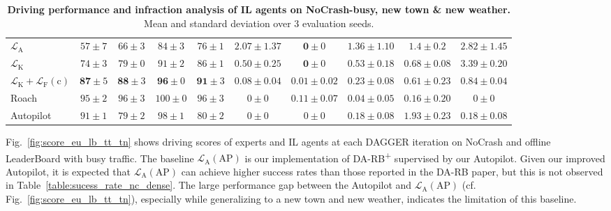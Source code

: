 \begin{table}
\begin{tabular}{lccccccccc}
		$\mathcal{L}_\text{A}$
		& $57\pm7$ & $66\pm3$ & $84\pm3$ & $76\pm1$ 
		& $2.07\pm1.37$ & $\mathbf{0}\pm0$ & $1.36\pm1.10$ & $1.4\pm0.2$ & $2.82\pm1.45$ \\
		$\mathcal{L}_\text{K}$
		& $74\pm3$ & $79\pm0$ & $91\pm2$ & $86\pm1$ 
		& $0.50\pm0.25$ & $\mathbf{0}\pm0$ & $0.53\pm0.18$ & $0.68\pm0.08$ & $3.39\pm0.20$ \\
		$\mathcal{L}_\text{K}+\mathcal{L}_\text{F}(\text{c})$
		& $\mathbf{87} \pm 5$ & $\mathbf{88} \pm 3$ & $\mathbf{96} \pm 0$ & $\mathbf{91} \pm 3$ 
		& $\mathbf{0.08} \pm 0.04$ & $0.01 \pm 0.02$ & $\mathbf{0.23} \pm 0.08$ & $\mathbf{0.61} \pm 0.23$ & $\mathbf{0.84} \pm 0.04$ \\
		\cmidrule(lr){1-1}\cmidrule(lr){2-5}\cmidrule(lr){6-10}
		Roach
		& $95 \pm 2$ & $96 \pm 3$ & $100 \pm 0$ & $96 \pm 3$ 
		& $0 \pm 0$ & $0.11 \pm 0.07$ & $0.04 \pm 0.05$ & $0.16 \pm 0.20$ & $0 \pm 0$ \\
		Autopilot
		& $91 \pm 1$ & $79 \pm 2$ & $98 \pm 1$ & $80 \pm 2$ 
		& $0 \pm 0$ & $0 \pm 0$ & $0.18 \pm 0.08$ & $1.93 \pm 0.23$ & $0.18 \pm 0.08$\\
		\bottomrule
	\end{tabular}
	\vspace{-1ex}
	\caption{\textbf{Driving performance and infraction analysis of IL agents on NoCrash-busy, new town \& new weather.} Mean and standard deviation over 3 evaluation seeds.}
	\vspace{-2.5ex}
	\label{table:infraction}
\end{table}

\vspace{1ex}
Fig.~\ref{fig:score_eu_lb_tt_tn} shows driving scores of experts and IL agents at each DAGGER iteration on NoCrash and offline LeaderBoard with busy traffic.
The baseline $\mathcal{L}_\text{A}(\text{AP})$ is our implementation of DA-RB\textsuperscript{+} supervised by our Autopilot. 
Given our improved Autopilot, it is expected that $\mathcal{L}_\text{A}(\text{AP})$ can achieve higher success rates than those reported in the DA-RB paper, but this is not observed in Table~\ref{table:sucess_rate_nc_dense}.
The large performance gap between the Autopilot and $\mathcal{L}_\text{A}(\text{AP})$ (cf. Fig.~\ref{fig:score_eu_lb_tt_tn}), especially while generalizing to a new town and new weather, indicates the limitation of this baseline.


